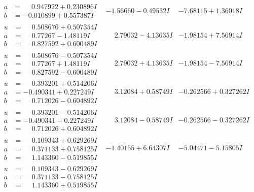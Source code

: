 \documentclass[1p]{elsarticle_modified}
\theoremstyle{definition}
\begin{document}
$$\begin{array}{c|c|c}
\begin{aligned}
a &= \phantom{-}0.947922 + 0.230896 I \\
b &= -0.010899 + 0.557387 I\end{aligned}
 & -1.56660 - 0.49532 I & -7.68115 + 1.36018 I \\ \hline\begin{aligned}
u &= \phantom{-}0.508676 + 0.507354 I \\
a &= \phantom{-}0.77267 - 1.48119 I \\
b &= \phantom{-}0.827592 + 0.600489 I\end{aligned}
 & \phantom{-}2.79032 - 4.13635 I & -1.98154 + 7.56914 I \\ \hline\begin{aligned}
u &= \phantom{-}0.508676 - 0.507354 I \\
a &= \phantom{-}0.77267 + 1.48119 I \\
b &= \phantom{-}0.827592 - 0.600489 I\end{aligned}
 & \phantom{-}2.79032 + 4.13635 I & -1.98154 - 7.56914 I \\ \hline\begin{aligned}
u &= \phantom{-}0.393201 + 0.514206 I \\
a &= -0.490341 + 0.227249 I \\
b &= \phantom{-}0.712026 - 0.604892 I\end{aligned}
 & \phantom{-}3.12084 + 0.58749 I & -0.262566 + 0.327262 I \\ \hline\begin{aligned}
u &= \phantom{-}0.393201 - 0.514206 I \\
a &= -0.490341 - 0.227249 I \\
b &= \phantom{-}0.712026 + 0.604892 I\end{aligned}
 & \phantom{-}3.12084 - 0.58749 I & -0.262566 - 0.327262 I \\ \hline\begin{aligned}
u &= \phantom{-}0.109343 + 0.629269 I \\
a &= \phantom{-}0.371133 + 0.758125 I \\
b &= \phantom{-}1.143360 - 0.519855 I\end{aligned}
 & -1.40155 + 6.64307 I & -5.04471 - 5.15805 I \\ \hline\begin{aligned}
u &= \phantom{-}0.109343 - 0.629269 I \\
a &= \phantom{-}0.371133 - 0.758125 I \\
b &= \phantom{-}1.143360 + 0.519855 I\end{aligned}

\end{array}$$
\end{document}
